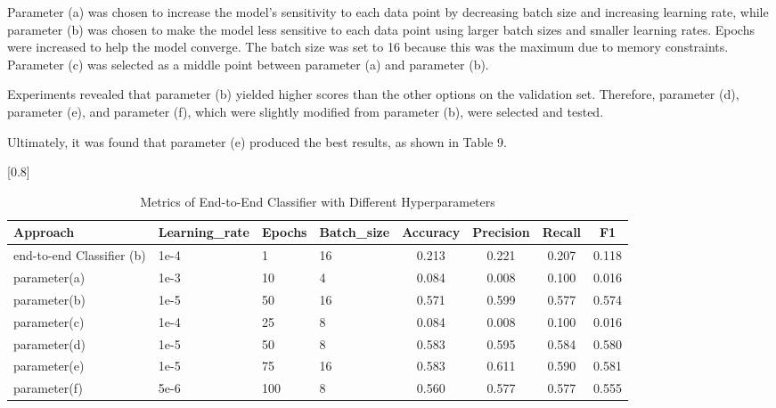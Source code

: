 \documentclass[a4paper,11pt]{article}
\begin{document}
Parameter (a) was chosen to increase the model's sensitivity to each data point by decreasing batch size and increasing learning rate,
while parameter (b) was chosen to make the model less sensitive to each data point using larger batch sizes and smaller learning rates.
Epochs were increased to help the model converge.
The batch size was set to 16 because this was the maximum due to memory constraints.
Parameter (c) was selected as a middle point between parameter (a) and parameter (b).

Experiments revealed that parameter (b) yielded higher scores than the other options on the validation set.
Therefore, parameter (d), parameter (e), and parameter (f), which were slightly modified from parameter (b), were selected and tested.

Ultimately, it was found that parameter (e) produced the best results, as shown in Table 9.

\begin{table}[htbp]
    \centering
    \caption{Metrics of End-to-End Classifier with Different Hyperparameters}
    \small
    \scalebox{0.8}[0.8]{
    \begin{tabular}{l|lll|cccc}
         Approach & Learning\_rate & Epochs & Batch\_size & Accuracy & Precision & Recall & F1 \\ \hline \hline
         end-to-end Classifier (b) & 1e-4& 1 & 16 & 0.213 & 0.221 &0.207 & 0.118 \\ \hline
         parameter(a)                  & 1e-3& 10& 4  & 0.084 & 0.008 & 0.100 & 0.016 \\
         parameter(b)                  & 1e-5& 50& 16 & 0.571 & 0.599 & 0.577 & 0.574 \\
         parameter(c)                  & 1e-4& 25& 8  & 0.084 & 0.008 & 0.100 & 0.016 \\ \hline
         parameter(d)                  & 1e-5& 50& 8  & 0.583 & 0.595 & 0.584 & 0.580 \\
         \rowcolor[rgb]{0.9,0.9,0}parameter(e)                  & 1e-5& 75& 16 & 0.583 & 0.611 & 0.590 & 0.581 \\
         parameter(f)                  & 5e-6& 100& 8 & 0.560 & 0.577 & 0.577 & 0.555 \\


    \end{tabular}

    }
\end{table}
\end{document}
